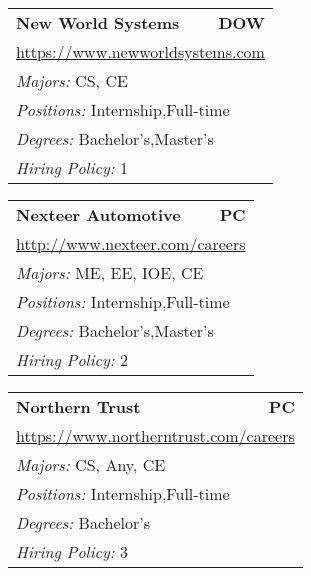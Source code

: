 \documentclass[twoside]{article}
\begin{document}
\begin{center}
\begin{multicols}{3}
\begin{FlushLeft}
\begin{minipage}{\columnwidth}
\end{minipage}
 
\begin{minipage}{\columnwidth}\begin{tabularx}{.95\columnwidth}{Xr}
                 {\Large\bf New World Systems} & {\Large\bf DOW}\\
    \multicolumn{2}{p{.95\columnwidth}}{\url{https://www.newworldsystems.com}}\\
    \multicolumn{2}{p{.95\columnwidth}}{\emph{Majors:} CS, CE}\\
    \multicolumn{2}{p{.95\columnwidth}}{\emph{Positions:} Internship,Full-time}\\
    \multicolumn{2}{p{.95\columnwidth}}{\emph{Degrees:} Bachelor's,Master's}\\
    \multicolumn{2}{p{.95\columnwidth}}{\emph{Hiring Policy:} 1}\\
    \end{tabularx}
    
\end{minipage}
 
\begin{minipage}{\columnwidth}\begin{tabularx}{.95\columnwidth}{Xr}
                 {\Large\bf Nexteer Automotive} & {\Large\bf PC}\\
    \multicolumn{2}{p{.95\columnwidth}}{\url{http://www.nexteer.com/careers}}\\
    \multicolumn{2}{p{.95\columnwidth}}{\emph{Majors:} ME, EE, IOE, CE}\\
    \multicolumn{2}{p{.95\columnwidth}}{\emph{Positions:} Internship,Full-time}\\
    \multicolumn{2}{p{.95\columnwidth}}{\emph{Degrees:} Bachelor's,Master's}\\
    \multicolumn{2}{p{.95\columnwidth}}{\emph{Hiring Policy:} 2}\\
    \end{tabularx}
    
\end{minipage}
 
\begin{minipage}{\columnwidth}\begin{tabularx}{.95\columnwidth}{Xr}
                 {\Large\bf Northern Trust} & {\Large\bf PC}\\
    \multicolumn{2}{p{.95\columnwidth}}{\url{https://www.northerntrust.com/careers}}\\
    \multicolumn{2}{p{.95\columnwidth}}{\emph{Majors:} CS, Any, CE}\\
    \multicolumn{2}{p{.95\columnwidth}}{\emph{Positions:} Internship,Full-time}\\
    \multicolumn{2}{p{.95\columnwidth}}{\emph{Degrees:} Bachelor's}\\
    \multicolumn{2}{p{.95\columnwidth}}{\emph{Hiring Policy:} 3}\\
    \end{tabularx}
    

\end{minipage}
\end{FlushLeft}
\end{multicols}
\end{center}
\end{document}
